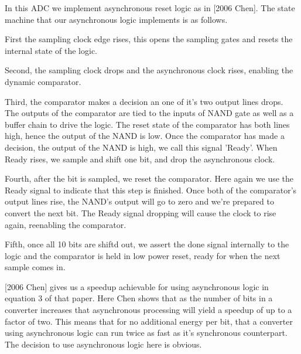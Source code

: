 \documentclass[10pt,journal]{IEEEtran}\usepackage{longtable}
\begin{document}

In this ADC we implement asynchronous reset logic as in [2006 Chen]. The state machine that our asynchronous logic implements is as follows.

First the sampling clock edge rises, this opens the sampling gates and resets the internal state of the logic.

Second, the sampling clock drops and the asynchronous clock rises, enabling the dynamic comparator.

Third, the comparator makes a decision an one of it's two output lines drops. 
The outputs of the comparator are tied to the inputs of NAND gate as well as a buffer chain to drive the logic.
The reset state of the comparator has both lines high, hence the output of the NAND is low.
Once the comparator has made a decision, the output of the NAND is high, we call this signal 'Ready'. When Ready rises, we sample and shift one bit, and drop the asynchronous clock.

Fourth, after the bit is sampled, we reset the comparator. Here again we use the Ready signal to indicate that this step is finished. Once both of the comparator's output lines rise, the NAND's output will go to zero and we're prepared to convert the next bit. The Ready signal dropping will cause the clock to rise again, reenabling the comparator.

Fifth, once all 10 bits are shiftd out, we assert the done signal internally to the logic and the comparator is held in low power reset, ready for when the next sample comes in.

[2006 Chen] gives us a speedup achievable for using asynchronous logic in equation 3 of that paper. Here Chen shows that as the number of bits in a converter increases that asynchronous processing will yield a speedup of up to a factor of two.
This means that for no additional energy per bit, that a converter using asynchronous logic can run twice as fast as it's synchronous counterpart. The decision to use asynchronous logic here is obvious.






\end{document}
